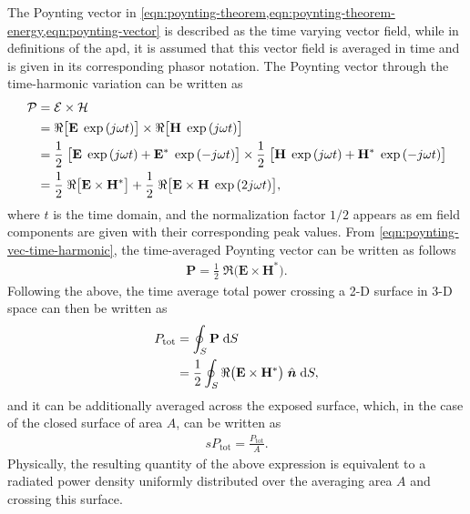 The Poynting vector in \cref{eqn:poynting-theorem,eqn:poynting-theorem-energy,eqn:poynting-vector} is described as the time varying vector field, while in definitions of the \gls{apd}, it is assumed that this vector field is averaged in time and is given in its corresponding phasor notation.
The Poynting vector through the time-harmonic variation can be written as
\begin{align}
    \label{eqn:poynting-vec-time-harmonic}
    \mathcal{P} &= \mathcal{E} \times \mathcal{H} \notag\\
                &= \Re \big[ \mathbf{E} \; \exp{(j \omega t)} \big] \times \Re \big[ \mathbf{H} \; \exp{(j \omega t)} \big] \notag\\
                &= \frac{1}{2} \; \big[ \mathbf{E} \; \exp{(j \omega t)} + \mathbf{E}^*  \; \exp{(-j \omega t)} \big] \times \frac{1}{2} \; \big[ \mathbf{H} \; \exp{(j \omega t)} + \mathbf{H}^*  \; \exp{(-j \omega t)} \big] \notag\\
                &= \frac{1}{2} \; \Re \big[ \mathbf{E} \times \mathbf{H}^* \big] + \frac{1}{2} \; \Re \big[ \mathbf{E} \times \mathbf{H} \; \exp{(2j \omega t)} \big], 
\end{align}
where $t$ is the time domain, and the normalization factor $1/2$ appears as \gls{em} field components are given with their corresponding peak values.
From \cref{eqn:poynting-vec-time-harmonic}, the time-averaged Poynting vector can be written as follows
\begin{align}
    \label{eqn:poynting-vec-time-avg}
    \mathbf{P} = \frac{1}{2} \; \Re \big( \mathbf{E} \times \mathbf{H}^* \big).
\end{align}
Following the above, the time average total power crossing a 2-D surface in 3-D space can then be written as
\begin{align}
    \label{eqn:poynting-flow}
    P_\text{tot} &= \oint_S \mathbf{P} \; \mathrm{d}S \notag\\
                 &= \frac{1}{2} \oint_S \Re \big( \mathbf{E} \times \mathbf{H}^* \big) \; \hat{\boldsymbol{n}} \; \mathrm{d}S,
\end{align}
and it can be additionally averaged across the exposed surface, which, in the case of the closed surface of area $A$, can be written as
\begin{align}
    sP_\text{tot} = \frac{P_\text{tot}}{A}.
\end{align}
Physically, the resulting quantity of the above expression is equivalent to a radiated power density uniformly distributed over the averaging area $A$ and crossing this surface.

